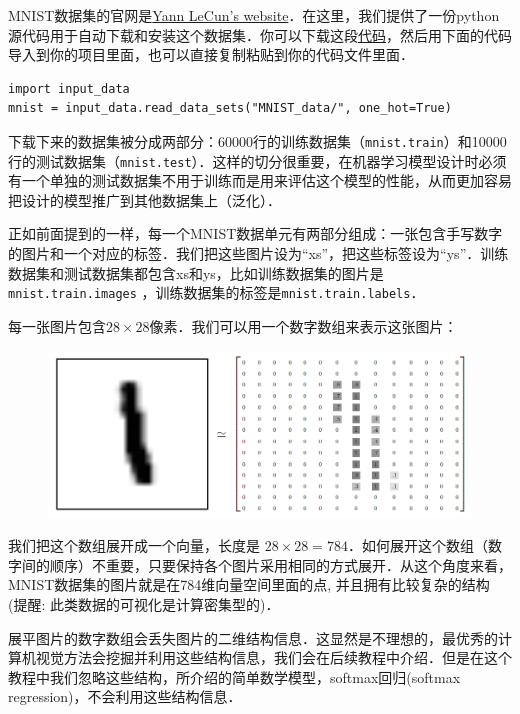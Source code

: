 MNIST数据集的官网是\href{http://yann.lecun.com/exdb/mnist/}{Yann LeCun's website}．在这里，我们提供了一份python源代码用于自动下载和安装这个数据集．你可以下载这段\href{https://tensorflow.googlesource.com/tensorflow/+/master/tensorflow/examples/tutorials/mnist/input_data.py}{代码}，然后用下面的代码导入到你的项目里面，也可以直接复制粘贴到你的代码文件里面．

\begin{lstlisting}
import input_data
mnist = input_data.read_data_sets("MNIST_data/", one_hot=True)
\end{lstlisting}

下载下来的数据集被分成两部分：60000行的训练数据集（\lstinline{mnist.train}）和10000行的测试数据集（\lstinline{mnist.test}）．这样的切分很重要，在机器学习模型设计时必须有一个单独的测试数据集不用于训练而是用来评估这个模型的性能，从而更加容易把设计的模型推广到其他数据集上（泛化）．

正如前面提到的一样，每一个MNIST数据单元有两部分组成：一张包含手写数字的图片和一个对应的标签．我们把这些图片设为“xs”，把这些标签设为“ys”．训练数据集和测试数据集都包含xs和ys，比如训练数据集的图片是\lstinline{mnist.train.images} ，训练数据集的标签是\lstinline{mnist.train.labels}．

每一张图片包含$ 28 \times 28$像素．我们可以用一个数字数组来表示这张图片：

\begin{figure}[htbp]
\centering
\includegraphics[width=.8\textwidth]{../SOURCE/images/MNIST-Matrix.png}
\caption{}
\end{figure}

我们把这个数组展开成一个向量，长度是 $ 28 \times 28 = 784$．如何展开这个数组（数字间的顺序）不重要，只要保持各个图片采用相同的方式展开．从这个角度来看，MNIST数据集的图片就是在784维向量空间里面的点, 并且拥有比较复杂的结构 (提醒: 此类数据的可视化是计算密集型的)．

展平图片的数字数组会丢失图片的二维结构信息．这显然是不理想的，最优秀的计算机视觉方法会挖掘并利用这些结构信息，我们会在后续教程中介绍．但是在这个教程中我们忽略这些结构，所介绍的简单数学模型，softmax回归(softmax regression)，不会利用这些结构信息．

